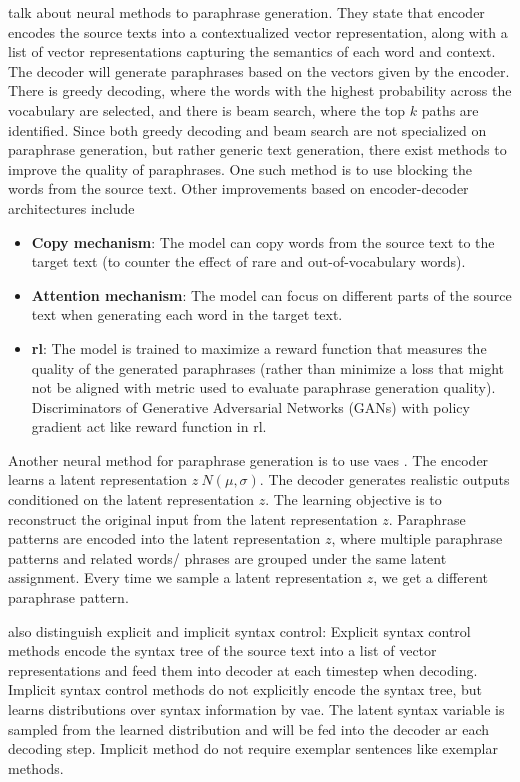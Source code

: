 \citet{zhou_paraphrase_2021} talk about neural methods to paraphrase generation.
They state that encoder encodes the source texts into a contextualized vector representation, 
along with a list of vector representations capturing the semantics of each word and context.
The decoder will generate paraphrases based on the vectors given by the encoder.
There is greedy decoding, where the words with the highest probability across the vocabulary are selected, 
and there is beam search, where the top $k$ paths are identified.
Since both greedy decoding and beam search are not specialized on paraphrase generation, but rather generic text generation, 
there exist methods to improve the quality of paraphrases.
One such method is to use blocking the words from the source text.
Other improvements based on encoder-decoder architectures include
\begin{itemize}
    \item \textbf{Copy mechanism}: The model can copy words from the source text to the target text (to counter the effect of rare and out-of-vocabulary words).
    \item \textbf{Attention mechanism}: The model can focus on different parts of the source text when generating each word in the target text.
    \item \textbf{\ac{rl}}: The model is trained to maximize a reward function that measures the quality of the generated paraphrases 
    (rather than minimize a loss that might not be aligned with metric used to evaluate paraphrase generation quality). 
    Discriminators of Generative Adversarial Networks (GANs) with policy gradient act like reward function in \ac{rl}.
\end{itemize}

Another neural method for paraphrase generation is to use \acp{vae} \cite{zhou_paraphrase_2021}.
The encoder learns a latent representation $z ~ N(\mu, \sigma)$.
The decoder generates realistic outputs conditioned on the latent representation $z$.
The learning objective is to reconstruct the original input from the latent representation $z$.
Paraphrase patterns are encoded into the latent representation $z$, where multiple paraphrase 
patterns and related words/ phrases are grouped under the same latent assignment.
Every time we sample a latent representation $z$, we get a different paraphrase pattern.

\citet{zhou_paraphrase_2021} also distinguish explicit and implicit syntax control:
Explicit syntax control methods encode the syntax tree of the source text into a list of vector representations 
and feed them into decoder at each timestep when decoding.
Implicit syntax control methods do not explicitly encode the syntax tree, 
but learns distributions over syntax information by \ac{vae}. 
The latent syntax variable is sampled from the learned distribution and will be fed into the decoder ar each decoding step.
Implicit method do not require exemplar sentences like exemplar methods.

